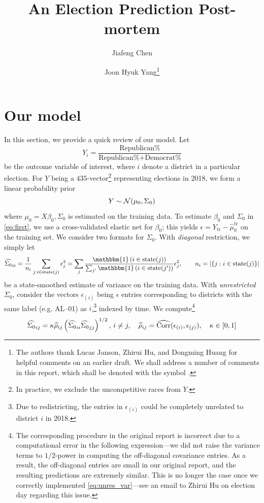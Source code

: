 \documentclass[12pt]{article}
\title{\sffamily\bfseries{An Election Prediction Post-mortem}}
\author{Jiafeng Chen \and Joon Hyuk Yang\thanks{The authors thank Lucas Janson, Zhirui Hu, and Dongming Huang for helpful comments on an earlier draft. We shall address a number of comments in this report, which shall be denoted with the symbol \cm.}}
\newcommand{\one}{\mathbbm{1}}
\begin{document}
\maketitle
\section{Our model}

In this section, we provide a quick review of our model. Let \begin{equation}
  Y_i = \frac{\text{Republican\%}}{\text{Republican\%}+\text{Democrat\%}}
  \label{eq:def_y}
\end{equation}
be the outcome variable of interest, where $i$ denote a district in a particular election. For $Y$ being a $435$-vector\footnote{In practice, we exclude the uncompetitive races from $Y$.} representing elections in 2018, we form a linear probability prior \begin{equation}
  Y \sim \mathcal{N}(\mu_0, \Sigma_0)\label{eq:first}
\end{equation}
where $\mu_0 = X\beta_0, \Sigma_0$ is estimated
on the training data. To estimate $\beta_0$ and $\Sigma_0$ in \eqref{eq:first}, we use a cross-validated elastic net for $\beta_0$; this yields $\epsilon = Y_{\text{tr}} - \hat \mu_0^{\text{tr}}$ on the training set. We consider two formats for $\Sigma_0$. With \emph{diagonal} restriction, we simply let 
\begin{equation}
  \hat {\Sigma_0}_{ii} = \frac{1}{n_i} \sum_{j : i\in\text{state}(j)} \epsilon_j^2 = \sum_j \frac{\one\pr{i\in\text{state}(j)}}{\sum_{j'} \one\pr{i\in\text{state}(j')}} \epsilon_j^2, \qquad n_i = |\{j : i\in\text{state}(j)\}|
\label{eq:diag_var}
\end{equation}
be a state-smoothed estimate of variance on the training data. With \emph{unrestricted} $\Sigma_0$, consider the vectors $\epsilon_{(i)}$ being $\epsilon$ entries corresponding to districts with the same label (e.g. AL--01) as $i$,\footnote{Due to redistricting, the entries in $\epsilon_{(i)}$ could be completely unrelated to district $i$ in 2018.} indexed by time. We compute\footnote{The corresponding procedure in the original report is incorrect due to a computational error in the following expression---we did not raise the variance terms to $1/2$-power in computing the off-diagonal covariance entries. As a result, the off-diagonal entries are small in our original report, and the resulting predictions are extremely similar. This is no longer the case once we correctly implemented \eqref{eq:unres_var}---see an email to Zhirui Hu on election day regarding this issue.} \begin{equation}
  \widehat{\Sigma_0}_{ij} = \kappa \widehat \rho_{ij} \left({\widehat {\Sigma_0}_{ii} \widehat {\Sigma_0}_{jj}}\right)^{1/2},\, i\neq j,\quad \widehat \rho_{ij} = \widehat{\operatorname{Corr}}(\epsilon_{(i)}, \epsilon_{(j)}), \quad \kappa\in [0,1]
\label{eq:unres_var}
\end{equation}
\end{document}

